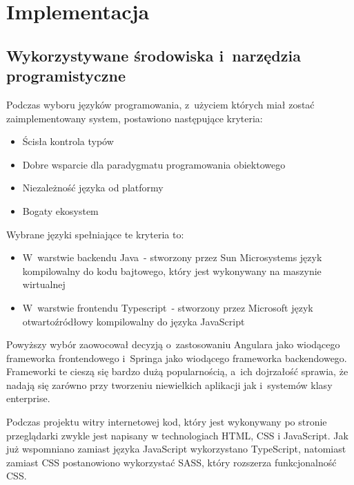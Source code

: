 \chapter{Implementacja}\label{ch:implementation}
\section{Wykorzystywane środowiska i~narzędzia programistyczne}\label{sec:dev-tools}

Podczas wyboru języków programowania, z~użyciem których miał zostać zaimplementowany system, postawiono następujące kryteria:

\begin{itemize}
    \item Ścisła kontrola typów
    \item Dobre wsparcie dla paradygmatu programowania obiektowego
    \item Niezależność języka od platformy
    \item Bogaty ekosystem
\end{itemize}

Wybrane języki spełniające te kryteria to:

\begin{itemize}
    \item W~warstwie backendu Java\cite{tech:java}~- stworzony przez Sun Microsystems język kompilowalny do kodu bajtowego, który jest wykonywany na maszynie wirtualnej
    \item W~warstwie frontendu Typescript\cite{tech:typescript}~- stworzony przez Microsoft język otwartoźródłowy kompilowalny do języka JavaScript\cite{tech:javascript}
\end{itemize}

Powyższy wybór zaowocował decyzją o~zastosowaniu Angulara\cite{tech:angular} jako wiodącego frameworka frontendowego
i~Springa\cite{tech:spring} jako wiodącego frameworka backendowego.
Frameworki te cieszą się bardzo dużą popularnością, a~ich dojrzałość sprawia,
że nadają się zarówno przy tworzeniu niewielkich aplikacji jak i~systemów klasy enterprise.

\par
Podczas projektu witry internetowej kod, który jest wykonywany po stronie przeglądarki zwykle jest napisany w technologiach HTML, CSS\cite{tech:html-css} i JavaScript\cite{tech:javascript}.
Jak już wspomniano zamiast języka JavaScript wykorzystano TypeScript, natomiast zamiast CSS postanowiono wykorzystać SASS\cite{tech:sass}, który rozszerza funkcjonalność CSS.

